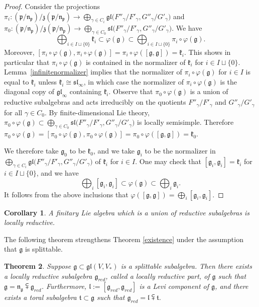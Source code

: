 \documentclass{article}
\def\gl{\mathfrak {gl}}
\def\g{\mathfrak {g}}
\def\l{\mathfrak {l}}
\def\n{\mathfrak {n}}
\def\p{\mathfrak {p}}
\def\sl{\mathfrak{sl}}
\def\t{\mathfrak{t}}
\def\z{\mathfrak {z}}
\def\k{\mathfrak{k}}
\newtheorem{thm}{Theorem}[section]
\newtheorem{cor}[thm]{Corollary}
\begin{document}
\begin{proof}
Consider the projections $\pi_i \colon ({\p} / {\n_\p} ) / \z({\p} / {\n_\p}) \rightarrow \bigoplus_{\gamma \in C_i}  \gl \big({F''_\gamma} / {F'_\gamma} , {G''_\gamma} / {G'_\gamma} \big)$ and $\pi_0 \colon ({\p} / {\n_\p} ) / \z({\p} / {\n_\p}) \rightarrow \bigoplus_{\gamma \in C_0}  \sl \big({F''_\gamma} / {F'_\gamma} , {G''_\gamma} / {G'_\gamma} \big)$.    We have
$$\bigoplus_{i \in I \sqcup \{ 0 \} } \k_i \subset \varphi (\g) \subset \bigoplus_{i \in I \sqcup \{0\} } \pi_i  \circ \varphi ( \g).$$ 
Moreover, $[\pi_i \circ \varphi (\g) , \pi_i \circ \varphi (\g)] = \pi_i \circ \varphi ([\g ,\g]) = \k_i$.  This shows in particular that $ \pi_i \circ \varphi ( \g)$ is contained in the normalizer of $\k_i$ for $i \in I \sqcup \{0\}$.  Lemma~\ref{infinitenormalizer} implies that the normalizer of $\pi_i \circ \varphi (\g)$ for $i \in I$ is equal to   $\k_i $ unless $\k_i \cong \sl_\infty$, in which case the normalizer of $\pi_i \circ \varphi (\g)$ is the diagonal copy of $\gl_\infty$ containing $\k_i$.   Observe that $\pi_0 \circ \varphi (\g)$ is a union of reductive subalgebras and acts irreducibly on the quotients ${F''_\gamma} / {F'_\gamma}$ and ${G''_\gamma} / {G'_\gamma}$ for all $\gamma \in C_0$.  By finite-dimensional Lie theory, $\pi_0 \circ \varphi (\g) \subset \bigoplus_{\gamma \in C_0}  \sl \big({F''_\gamma} / {F'_\gamma} , {G''_\gamma} / {G'_\gamma} \big)$ is locally semisimple.  Therefore $\pi_0 \circ \varphi (\g) = [\pi_0 \circ \varphi (\g) , \pi_0 \circ \varphi (\g) ] = \pi_0 \circ \varphi ( [\g,\g]) = \k_0$.

We therefore take $\g_0$ to be $\k_0$, and we take $\g_i$ to be the normalizer in $\bigoplus_{\gamma \in C_i}  \gl \big({F''_\gamma} / {F'_\gamma} , {G''_\gamma} / {G'_\gamma} \big)$ of $\k_i$ for $i \in I$.  One may check that $[\g_i, \g_i] = \k_i$ for $i \in I \sqcup \{0\}$, and we have 
$$\bigoplus_i [\g_i, \g_i] \subset \varphi(\g) \subset \bigoplus_i \g_i.$$
It follows from the above inclusions that $\varphi ([\g,\g]) = \bigoplus_i [\g_i , \g_i]$.
\end{proof}


\begin{cor} \label{unionreductive}
A finitary Lie algebra which is a union of reductive subalgebras is locally reductive.
\end{cor}


The following theorem strengthens Theorem \ref{existence} under the assumption that $\g$ is splittable. 


\begin{thm} \label{locreductivepart}
Suppose $\g \subset \gl(V,V_*)$ is a splittable subalgebra.  Then there exists a locally reductive subalgebra $\g_{red}$, called a \emph{locally reductive part}, of $\g$ such that $\g = \n_\g \subsetplus \g_{red}$.  Furthermore, $\l := [\g_{red},\g_{red}]$ is a Levi component of $\g$, and there exists a toral subalgebra $\t \subset \g$ such that $\g_{red} = \l \subsetplus \t$.
\end{thm}
\end{document}

